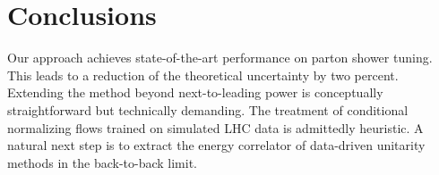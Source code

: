 \section{Conclusions}\label{sec:conclusions}

Our approach achieves state-of-the-art performance on parton shower
tuning. This leads to a reduction of the theoretical uncertainty by two
percent. Extending the method beyond next-to-leading power is
conceptually straightforward but technically demanding. The treatment of
conditional normalizing flows trained on simulated LHC data is
admittedly heuristic. A natural next step is to extract the energy
correlator of data-driven unitarity methods in the back-to-back limit.


